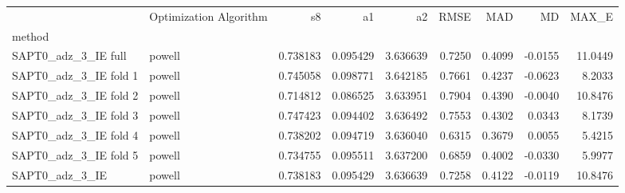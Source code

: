 \begin{tabular}{llrrrrrrr}
 & Optimization Algorithm & s8 & a1 & a2 & RMSE & MAD & MD & MAX_E \\
method &  &  &  &  &  &  &  &  \\
SAPT0_adz_3_IE full & powell & 0.738183 & 0.095429 & 3.636639 & 0.7250 & 0.4099 & -0.0155 & 11.0449 \\
SAPT0_adz_3_IE fold 1 & powell & 0.745058 & 0.098771 & 3.642185 & 0.7661 & 0.4237 & -0.0623 & 8.2033 \\
SAPT0_adz_3_IE fold 2 & powell & 0.714812 & 0.086525 & 3.633951 & 0.7904 & 0.4390 & -0.0040 & 10.8476 \\
SAPT0_adz_3_IE fold 3 & powell & 0.747423 & 0.094402 & 3.636492 & 0.7553 & 0.4302 & 0.0343 & 8.1739 \\
SAPT0_adz_3_IE fold 4 & powell & 0.738202 & 0.094719 & 3.636040 & 0.6315 & 0.3679 & 0.0055 & 5.4215 \\
SAPT0_adz_3_IE fold 5 & powell & 0.734755 & 0.095511 & 3.637200 & 0.6859 & 0.4002 & -0.0330 & 5.9977 \\
SAPT0_adz_3_IE & powell & 0.738183 & 0.095429 & 3.636639 & 0.7258 & 0.4122 & -0.0119 & 10.8476 \\
\end{tabular}
